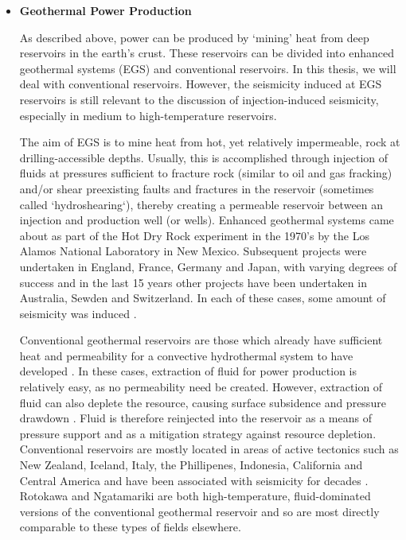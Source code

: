 \begin{itemize}
  \item{\textbf{Geothermal Power Production}}
  
  As described above, power can be produced by `mining' heat from deep reservoirs in the earth's crust. These reservoirs can be divided into enhanced geothermal systems (EGS) and conventional reservoirs. In this thesis, we will deal with conventional reservoirs. However, the seismicity induced at EGS reservoirs is still relevant to the discussion of injection-induced seismicity, especially in medium to high-temperature reservoirs.
  
  The aim of EGS is to mine heat from hot, yet relatively impermeable, rock at drilling-accessible depths. Usually, this is accomplished through injection of fluids at pressures sufficient to fracture rock (similar to oil and gas fracking) and/or shear preexisting faults and fractures in the reservoir (sometimes called `hydroshearing`), thereby creating a permeable reservoir between an injection and production well (or wells). Enhanced geothermal systems came about as part of the Hot Dry Rock experiment in the 1970's by the Los Alamos National Laboratory \citep{2013} in New Mexico. Subsequent projects were undertaken in England, France, Germany and Japan, with varying degrees of success and in the last 15 years other projects have been undertaken in Australia, Sewden and Switzerland. In each of these cases, some amount of seismicity was induced \citep{2013,Baria_1989,Baisch_2006,Evans_2004,Deichmann_2009}.
  
  Conventional geothermal reservoirs are those which already have sufficient heat and \gls{permeability} for a convective hydrothermal system to have developed \citep{Grant_2011}. In these cases, extraction of fluid for power production is relatively easy, as no \gls{permeability} need be created. However, extraction of fluid can also deplete the resource, causing surface subsidence and pressure drawdown \citep{Grant_2011}. Fluid is therefore reinjected into the reservoir as a means of pressure support and as a mitigation strategy against resource depletion. Conventional reservoirs are mostly located in areas of active tectonics such as New Zealand, Iceland, Italy, the Phillipenes, Indonesia, California and Central America and have been associated with seismicity for decades \citep[e.g.][]{Batini_1985,Allis_1982}. Rotokawa and Ngatamariki are both high-temperature, fluid-dominated versions of the conventional geothermal reservoir and so are most directly comparable to these types of fields elsewhere.
\end{itemize}

